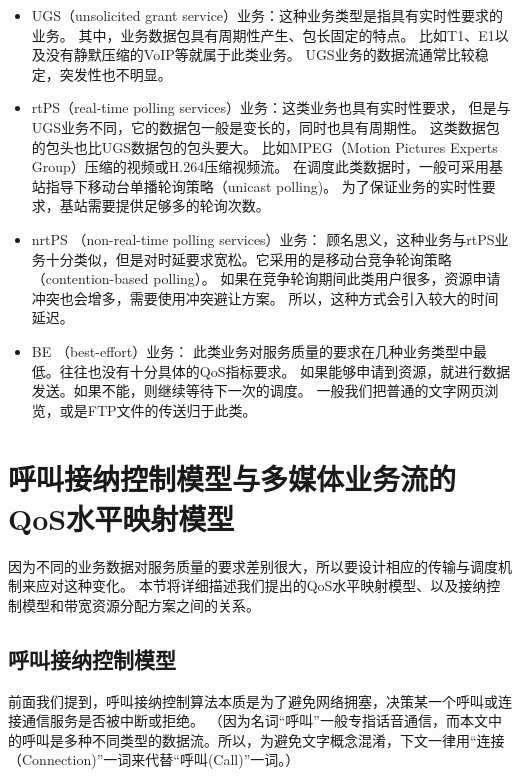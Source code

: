 \begin{itemize}
\item UGS（unsolicited grant service）业务：这种业务类型是指具有实时性要求的业务。
    其中，业务数据包具有周期性产生、包长固定的特点。
    比如T1、E1以及没有静默压缩的VoIP等就属于此类业务。
    UGS业务的数据流通常比较稳定，突发性也不明显。
\item rtPS（real-time polling services）业务：这类业务也具有实时性要求，
    但是与UGS业务不同，它的数据包一般是变长的，同时也具有周期性。
    这类数据包的包头也比UGS数据包的包头要大。
    比如MPEG（Motion Pictures Experts Group）压缩的视频或H.264压缩视频流。
    在调度此类数据时，一般可采用基站指导下移动台单播轮询策略（unicast polling)。
    为了保证业务的实时性要求，基站需要提供足够多的轮询次数。
\item nrtPS （non-real-time polling services）业务：
    顾名思义，这种业务与rtPS业务十分类似，但是对时延要求宽松。它采用的是移动台竞争轮询策略（contention-based polling）。
    如果在竞争轮询期间此类用户很多，资源申请冲突也会增多，需要使用冲突避让方案。
    所以，这种方式会引入较大的时间延迟。
\item BE （best-effort）业务：
    此类业务对服务质量的要求在几种业务类型中最低。往往也没有十分具体的QoS指标要求。
    如果能够申请到资源，就进行数据发送。如果不能，则继续等待下一次的调度。
    一般我们把普通的文字网页浏览，或是FTP文件的传送归于此类。
\end{itemize}

\section{呼叫接纳控制模型与多媒体业务流的QoS水平映射模型}
\label{sec_qos_metric}
因为不同的业务数据对服务质量的要求差别很大，所以要设计相应的传输与调度机制来应对这种变化。
本节将详细描述我们提出的QoS水平映射模型、以及接纳控制模型和带宽资源分配方案之间的关系。

\subsection{呼叫接纳控制模型}
\label{sec_sec_model}
前面我们提到，呼叫接纳控制算法本质是为了避免网络拥塞，决策某一个呼叫或连接通信服务是否被中断或拒绝。
（因为名词“呼叫”一般专指话音通信，而本文中的呼叫是多种不同类型的数据流。所以，为避免文字概念混淆，下文一律用“连接（Connection)”一词来代替“呼叫(Call)”一词。）

